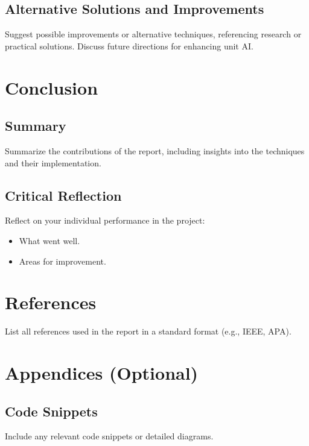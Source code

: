 \documentclass[a4paper,12pt]{article}
\begin{document}
\subsection{Alternative Solutions and Improvements}
Suggest possible improvements or alternative techniques, referencing research or practical solutions. Discuss future directions for enhancing unit AI.

\section{Conclusion}
\subsection{Summary}
Summarize the contributions of the report, including insights into the techniques and their implementation.

\subsection{Critical Reflection}
Reflect on your individual performance in the project:
\begin{itemize}
    \item What went well.
    \item Areas for improvement.
\end{itemize}

\section*{References}
List all references used in the report in a standard format (e.g., IEEE, APA).

\section*{Appendices (Optional)}
\subsection*{Code Snippets}
Include any relevant code snippets or detailed diagrams.
\end{document}
